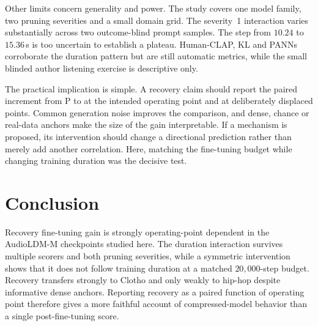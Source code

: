 Other limits concern generality and power. The study covers one model family, two pruning severities and a small domain grid. The severity~1 interaction varies substantially across two outcome-blind prompt samples. The step from $10.24$ to $15.36$\,s is too uncertain to establish a plateau. Human-CLAP, KL and PANNs corroborate the duration pattern but are still automatic metrics, while the small blinded author listening exercise is descriptive only.

The practical implication is simple. A recovery claim should report the paired increment from P to \PFT{} at the intended operating point and at deliberately displaced points. Common generation noise improves the comparison, and dense, chance or real-data anchors make the size of the gain interpretable. If a mechanism is proposed, its intervention should change a directional prediction rather than merely add another correlation. Here, matching the fine-tuning budget while changing training duration was the decisive test.

\section{Conclusion}
Recovery fine-tuning gain is strongly operating-point dependent in the AudioLDM-M checkpoints studied here. The duration interaction survives multiple scorers and both pruning severities, while a symmetric intervention shows that it does not follow training duration at a matched $20{,}000$-step budget. Recovery transfers strongly to Clotho and only weakly to hip-hop despite informative dense anchors. Reporting recovery as a paired function of operating point therefore gives a more faithful account of compressed-model behavior than a single post-fine-tuning score.

